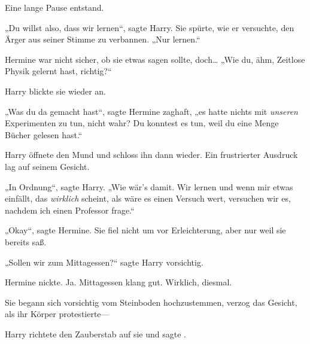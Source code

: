 Eine lange Pause entstand.

„Du willst also, dass wir lernen“, sagte Harry. Sie spürte, wie er versuchte, den Ärger aus seiner Stimme zu verbannen. „Nur lernen.“

Hermine war nicht sicher, ob sie etwas sagen sollte, doch… „Wie du, ähm, Zeitlose Physik gelernt hast, richtig?“

Harry blickte sie wieder an.

„Was du da gemacht hast“, sagte Hermine zaghaft, „es hatte nichts mit \emph{unseren} Experimenten zu tun, nicht wahr? Du konntest es tun, weil du eine Menge Bücher gelesen hast.“

Harry öffnete den Mund und schloss ihn dann wieder. Ein frustrierter Ausdruck lag auf seinem Gesicht.

„In Ordnung“, sagte Harry. „Wie wär’s damit. Wir lernen und wenn mir etwas einfällt, das \emph{wirklich} scheint, als wäre es einen Versuch wert, versuchen wir es, nachdem ich einen Professor frage.“

„Okay“, sagte Hermine. Sie fiel nicht um vor Erleichterung, aber nur weil sie bereits saß.

„Sollen wir zum Mittagessen?“ sagte Harry vorsichtig.

Hermine nickte. Ja. Mittagessen klang gut. Wirklich, diesmal.

Sie begann sich vorsichtig vom Steinboden hochzustemmen, verzog das Gesicht, als ihr Körper protestierte—

Harry richtete den Zauberstab auf sie und sagte .

